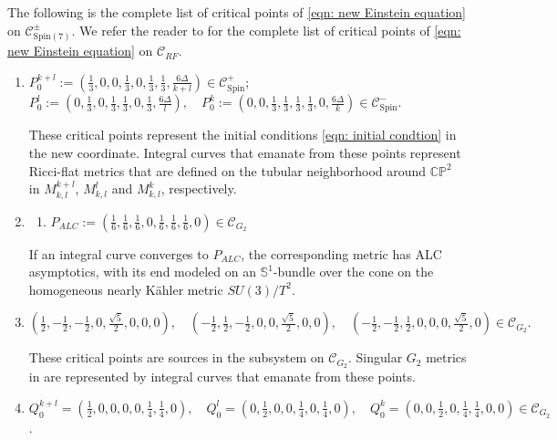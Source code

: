 \documentclass[11pt,letterpaper]{amsart}
\theoremstyle{definition}
\numberwithin{equation}{section}
\newcommand{\spin}{\mathrm{Spin}}
\begin{document}
The following is the complete list of critical points of \eqref{eqn: new Einstein equation} on $\mathcal{C}_{\spin(7)}^\pm$. We refer the reader to \cite{chi2022spin} for the complete list of critical points of \eqref{eqn: new Einstein equation} on $\mathcal{C}_{RF}$.
\begin{enumerate}[I]
\item
$P_0^{k+l}:=\left(\frac{1}{3},0,0,\frac{1}{3},0,\frac{1}{3},\frac{1}{3},\frac{6\Delta}{k+l}\right)\in \mathcal{C}_{\spin}^+$;\\
$P_0^{l}:=\left(0,\frac{1}{3},0,\frac{1}{3},\frac{1}{3},0,\frac{1}{3},\frac{6\Delta}{l}\right),\quad P_0^{k}:=\left(0,0,\frac{1}{3},\frac{1}{3},\frac{1}{3},\frac{1}{3},0,\frac{6\Delta}{k}\right)\in \mathcal{C}_{\spin}^-$.

These critical points represent the initial conditions \eqref{eqn: initial condtion} in the new coordinate. Integral curves that emanate from these points represent Ricci-flat metrics that are defined on the tubular neighborhood around $\mathbb{CP}^2$ in $M_{k,l}^{k+l}$, $M_{k,l}^{l}$ and  $M_{k,l}^{k}$, respectively.
\item
\begin{enumerate}
\item
$P_{ALC}:=\left(\frac{1}{6},\frac{1}{6},\frac{1}{6},0,\frac{1}{6},\frac{1}{6},\frac{1}{6},0\right)\in\mathcal{C}_{G_2}$
\end{enumerate}

If an integral curve converges to $P_{ALC}$, the corresponding metric has ALC asymptotics, with its end modeled on an 
$\mathbb{S}^1$-bundle over the cone on the homogeneous nearly K\"ahler metric $SU(3)/T^2$.

\item
$\left(\frac{1}{2},-\frac{1}{2},-\frac{1}{2},0,\frac{\sqrt{5}}{2},0,0,0\right),\quad \left(-\frac{1}{2},\frac{1}{2},-\frac{1}{2},0,0,\frac{\sqrt{5}}{2},0,0\right),\quad \left(-\frac{1}{2},-\frac{1}{2},\frac{1}{2},0,0,0,\frac{\sqrt{5}}{2},0\right)\in \mathcal{C}_{G_2}.$

These critical points are sources in the subsystem on $\mathcal{C}_{G_2}$. Singular $G_2$ metrics in \cite{cleyton_cohomogeneity-one_2002} are represented by integral curves that emanate from these points.
\item
$Q_0^{k+l}=\left(\frac{1}{2},0,0,0,0,\frac{1}{4},\frac{1}{4},0\right),\quad  Q_0^l=\left(0,\frac{1}{2},0,0,\frac{1}{4},0,\frac{1}{4},0\right),\quad Q_0^k=\left(0,0,\frac{1}{2},0,\frac{1}{4},\frac{1}{4},0,0\right)\in \mathcal{C}_{G_2}$.


\end{enumerate}
\end{document}
